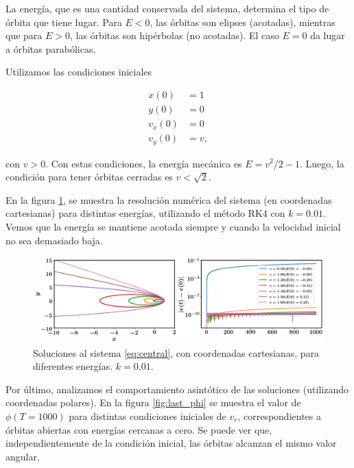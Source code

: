 \documentclass[12pt]{article}
\begin{document}
La energ\'ia, que es una cantidad conservada del sistema, determina el tipo de \'orbita que tiene lugar. Para $E<0$, las \'orbitas son elipses (acotadas), mientras que para $E>0$, las \'orbitas son hip\'erbolas (no acotadas). El caso $E=0$ da lugar a \'orbitas parab\'olicas.

Utilizamos las condiciones iniciales 

\begin{align}
x(0) &= 1 \\
y(0) &= 0 \\
v_x(0) &= 0 \\
v_y(0) &= v,
\end{align}

con $v > 0$. Con estas condiciones, la energ\'ia mec\'anica es $E = v^2/2 - 1$. Luego, la condici\'on para tener \'orbitas cerradas es $v < \sqrt{2}$.

En la figura \ref{fig:cartesianas}, se muestra la resoluci\'on num\'erica del sistema (en coordenadas cartesianas) para distintas energ\'ias, utilizando el m\'etodo RK4 con $k = 0.01$. Vemos que la energ\'ia se mantiene acotada siempre y cuando la velocidad inicial no sea demasiado baja. 

\begin{figure}
\centering
\includegraphics[scale=0.3]{cartesianas.png}
\caption{\label{fig:cartesianas} Soluciones al sistema \ref{eq:central}, con coordenadas cartesianas, para diferentes energ\'ias. $k = 0.01$.}
\end{figure}


Por \'ultimo, analizamos el comportamiento asint\'otico de las soluciones (utilizando coordenadas polares). En la figura \ref{fig:last_phi} se muestra el valor de $\phi(T=1000)$ para distintas condiciones iniciales de $v_r$, correspondientes a \'orbitas abiertas con energ\'ias cercanas a cero. Se puede ver que, independientemente de la condici\'on inicial, las \'orbitas alcanzan el mismo valor angular.
\end{document}
